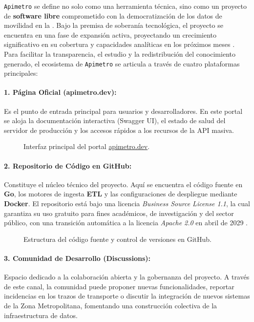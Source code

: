 \texttt{Apimetro} se define no solo como una herramienta técnica, sino como un proyecto de \textbf{software libre} comprometido con la democratización de los datos de movilidad en la \zmvm. Bajo la premisa de soberanía tecnológica, 
el proyecto se encuentra en una fase de expansión activa, proyectando un crecimiento significativo en su cobertura y capacidades analíticas en los próximos meses \parencite{cabrera2025apimetro}. 
Para facilitar la transparencia, el estudio y la redistribución del conocimiento generado, el ecosistema de \texttt{Apimetro} se articula a través de cuatro plataformas principales:

\paragraph{1. Página Oficial (apimetro.dev):} Es el punto de entrada principal para usuarios y desarrolladores. En este portal se aloja la documentación interactiva (Swagger UI), el estado de salud del servidor de producción y los 
accesos rápidos a los recursos de la API masiva.

\begin{figure}[htbp]
  \centering
  \caption{Interfaz principal del portal \url{apimetro.dev}.}
  \label{fig:screenshot-web}
\end{figure}

\paragraph{2. Repositorio de Código en GitHub:} Constituye el núcleo técnico del proyecto. Aquí se encuentra el código fuente en \textbf{Go}, los motores de ingesta \textbf{ETL} y las configuraciones de despliegue mediante \textbf{Docker}. 
El repositorio está bajo una licencia \textit{Business Source License 1.1}, la cual garantiza su uso gratuito para fines académicos, de investigación y del sector público, con una transición automática a la licencia \textit{Apache 2.0} 
en abril de 2029 \parencite{cabrera2025apimetro}.

\begin{figure}[htbp]
  \centering
  \caption{Estructura del c{\'o}digo fuente y control de versiones en GitHub.}
  \label{fig:screenshot-repo}
\end{figure}

\paragraph{3. Comunidad de Desarrollo (Discussions):} Espacio dedicado a la colaboración abierta y la gobernanza del proyecto. A través de este canal, la comunidad puede proponer nuevas funcionalidades, reportar incidencias en los trazos 
de transporte o discutir la integración de nuevos sistemas de la Zona Metropolitana, fomentando una construcción colectiva de la infraestructura de datos.

